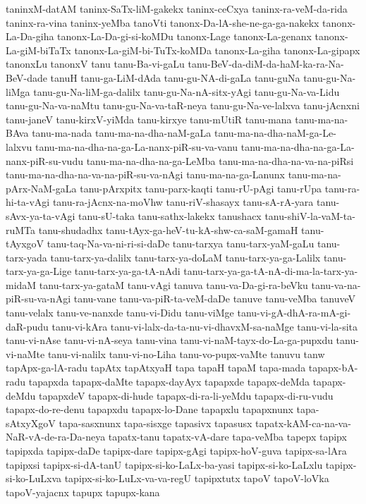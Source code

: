 {taninxM-datAM
taninx-SaTx-liM-gakekx
taninx-ceCxya
taninx-ra-veM-da-rida
taninx-ra-vina
taninx-yeMba
tanoVti
tanonx-Da-lA-she-ne-ga-ga-nakekx
tanonx-La-Da-giha
tanonx-La-Da-gi-si-koMDu
tanonx-Lage
tanonx-La-genanx
tanonx-La-giM-biTaTx
tanonx-La-giM-bi-TuTx-koMDa
tanonx-La-giha
tanonx-La-gipapx
tanonxLu
tanonxV
tanu
tanu-Ba-vi-gaLu
tanu-BeV-da-diM-da-haM-ka-ra-Na-BeV-dade
tanuH
tanu-ga-LiM-dAda
tanu-gu-NA-di-gaLa
tanu-guNa
tanu-gu-Na-liMga
tanu-gu-Na-liM-ga-dalilx
tanu-gu-Na-nA-sitx-yAgi
tanu-gu-Na-va-Lidu
tanu-gu-Na-va-naMtu
tanu-gu-Na-va-taR-neya
tanu-gu-Na-ve-lalxva
tanu-jAcnxni
tanu-janeV
tanu-kirxV-yiMda
tanu-kirxye
tanu-mUtiR
tanu-mana
tanu-ma-na-BAva
tanu-ma-nada
tanu-ma-na-dha-naM-gaLa
tanu-ma-na-dha-naM-ga-Le-lalxvu
tanu-ma-na-dha-na-ga-La-nanx-piR-su-va-vanu
tanu-ma-na-dha-na-ga-La-nanx-piR-su-vudu
tanu-ma-na-dha-na-ga-LeMba
tanu-ma-na-dha-na-va-na-piRsi
tanu-ma-na-dha-na-va-na-piR-su-va-nAgi
tanu-ma-na-ga-Lanunx
tanu-ma-na-pArx-NaM-gaLa
tanu-pArxpitx
tanu-parx-kaqti
tanu-rU-pAgi
tanu-rUpa
tanu-ra-hi-ta-vAgi
tanu-ra-jAcnx-na-moVhw
tanu-riV-shasayx
tanu-sA-rA-yara
tanu-sAvx-ya-ta-vAgi
tanu-sU-taka
tanu-sathx-lakekx
tanushacx
tanu-shiV-la-vaM-ta-ruMTa
tanu-shudadhx
tanu-tAyx-ga-heV-tu-kA-shw-ca-saM-gamaH
tanu-tAyxgoV
tanu-taq-Na-va-ni-ri-si-daDe
tanu-tarxya
tanu-tarx-yaM-gaLu
tanu-tarx-yada
tanu-tarx-ya-dalilx
tanu-tarx-ya-doLaM
tanu-tarx-ya-ga-Lalilx
tanu-tarx-ya-ga-Lige
tanu-tarx-ya-ga-tA-nAdi
tanu-tarx-ya-ga-tA-nA-di-ma-la-tarx-ya-midaM
tanu-tarx-ya-gataM
tanu-vAgi
tanuva
tanu-va-Da-gi-ra-beVku
tanu-va-na-piR-su-va-nAgi
tanu-vane
tanu-va-piR-ta-veM-daDe
tanuve
tanu-veMba
tanuveV
tanu-velalx
tanu-ve-nanxde
tanu-vi-Didu
tanu-viMge
tanu-vi-gA-dhA-ra-mA-gi-daR-pudu
tanu-vi-kAra
tanu-vi-lalx-da-ta-nu-vi-dhavxM-sa-naMge
tanu-vi-la-sita
tanu-vi-nAse
tanu-vi-nA-seya
tanu-vina
tanu-vi-naM-tayx-do-La-ga-pupxdu
tanu-vi-naMte
tanu-vi-nalilx
tanu-vi-no-Liha
tanu-vo-pupx-vaMte
tanuvu
tanw
tapApx-ga-lA-radu
tapAtx
tapAtxyaH
tapa
tapaH
tapaM
tapa-mada
tapapx-bA-radu
tapapxda
tapapx-daMte
tapapx-dayAyx
tapapxde
tapapx-deMda
tapapx-deMdu
tapapxdeV
tapapx-di-hude
tapapx-di-ra-li-yeMdu
tapapx-di-ru-vudu
tapapx-do-re-denu
tapapxdu
tapapx-lo-Dane
tapapxlu
tapapxnunx
tapa-sAtxyXgoV
tapa-sasxnunx
tapa-sisxge
tapasivx
tapasusx
tapatx-kAM-ca-na-va-NaR-vA-de-ra-Da-neya
tapatx-tanu
tapatx-vA-dare
tapa-veMba
tapepx
tapipx
tapipxda
tapipx-daDe
tapipx-dare
tapipx-gAgi
tapipx-hoV-guva
tapipx-sa-lAra
tapipxsi
tapipx-si-dA-tanU
tapipx-si-ko-LaLx-ba-yasi
tapipx-si-ko-LaLxlu
tapipx-si-ko-LuLxva
tapipx-si-ko-LuLx-va-va-regU
tapipxtutx
tapoV
tapoV-loVka
tapoV-yajacnx
tapupx
tapupx-kana
}
